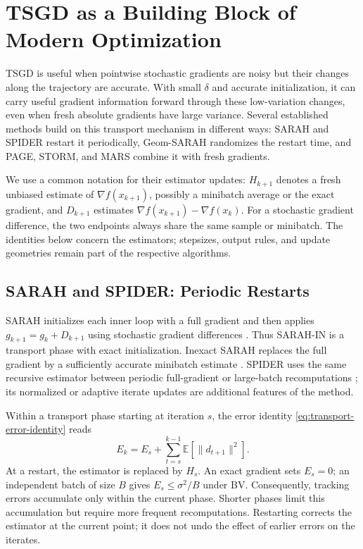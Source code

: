 \section{TSGD as a Building Block of Modern Optimization}
\label{sec:connections}

TSGD is useful when pointwise stochastic gradients are noisy but their
changes along the trajectory are accurate. With small $\delta$ and
accurate initialization, it can carry useful gradient information
forward through these low-variation changes, even when fresh absolute
gradients have large variance. Several established methods build on
this transport mechanism in different ways: SARAH and SPIDER restart
it periodically, Geom-SARAH randomizes the restart time, and PAGE,
STORM, and MARS combine it with fresh gradients.

We use a common notation for their estimator updates: $H_{k+1}$ denotes
a fresh unbiased estimate of $\nabla f(x_{k+1})$, possibly a minibatch
average or the exact gradient, and $D_{k+1}$ estimates
$\nabla f(x_{k+1})-\nabla f(x_k)$. For a stochastic gradient difference,
the two endpoints always share the same sample or minibatch. The
identities below concern the estimators; stepsizes, output rules, and
update geometries remain part of the respective algorithms.

\subsection{SARAH and SPIDER: Periodic Restarts}
\label{subsec:periodic-restarts}

SARAH initializes each inner loop with a full gradient and then applies
$g_{k+1}=g_k+D_{k+1}$ using stochastic gradient differences
\citep{nguyen2017sarah,nguyen2017sarah_nonconvex}. Thus SARAH-IN is a
transport phase with exact initialization. Inexact SARAH replaces the
full gradient by a sufficiently accurate minibatch estimate
\citep{nguyen2021inexact}. SPIDER uses the same recursive estimator
between periodic full-gradient or large-batch recomputations
\citep{fang2018spider}; its normalized or adaptive iterate updates are
additional features of the method.

Within a transport phase starting at iteration $s$, the error identity
\eqref{eq:transport-error-identity} reads
\begin{equation}
\label{eq:restart-error-window}
E_k=E_s+\sum_{t=s}^{k-1}\mathbb E[\|d_{t+1}\|^2].
\end{equation}
At a restart, the estimator is replaced by $H_s$. An exact gradient sets
$E_s=0$; an independent batch of size $B$ gives $E_s\leq\sigma^2/B$
under BV. Consequently, tracking errors accumulate only within the
current phase. Shorter phases limit this accumulation but require more
frequent recomputations. Restarting corrects the estimator at the current
point; it does not undo the effect of earlier errors on the iterates.

